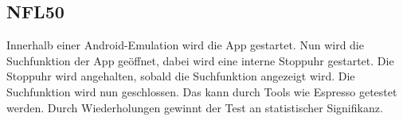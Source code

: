 \subsection*{NFL50}

Innerhalb einer Android-Emulation wird die App gestartet.
Nun wird die Suchfunktion der App geöffnet, dabei wird eine interne Stoppuhr gestartet.
Die Stoppuhr wird angehalten, sobald die Suchfunktion angezeigt wird.
Die Suchfunktion wird nun geschlossen.
Das kann durch Tools wie Espresso getestet werden.
Durch Wiederholungen gewinnt der Test an statistischer Signifikanz.